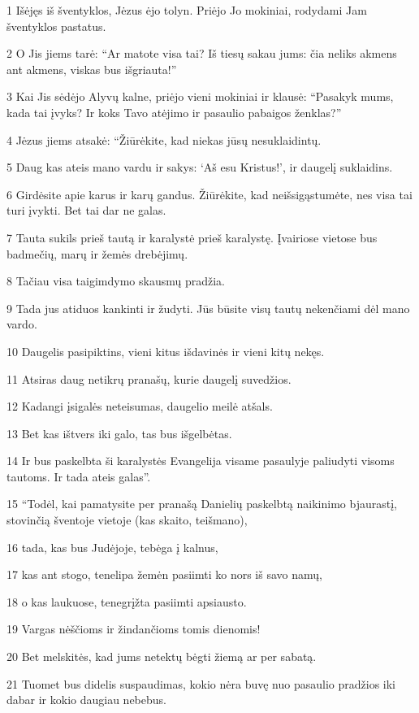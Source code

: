 \par 1 Išėjęs iš šventyklos, Jėzus ėjo tolyn. Priėjo Jo mokiniai, rodydami Jam šventyklos pastatus. 
\par 2 O Jis jiems tarė: “Ar matote visa tai? Iš tiesų sakau jums: čia neliks akmens ant akmens, viskas bus išgriauta!” 
\par 3 Kai Jis sėdėjo Alyvų kalne, priėjo vieni mokiniai ir klausė: “Pasakyk mums, kada tai įvyks? Ir koks Tavo atėjimo ir pasaulio pabaigos ženklas?” 
\par 4 Jėzus jiems atsakė: “Žiūrėkite, kad niekas jūsų nesuklaidintų. 
\par 5 Daug kas ateis mano vardu ir sakys: ‘Aš esu Kristus!’, ir daugelį suklaidins. 
\par 6 Girdėsite apie karus ir karų gandus. Žiūrėkite, kad neišsigąstumėte, nes visa tai turi įvykti. Bet tai dar ne galas. 
\par 7 Tauta sukils prieš tautą ir karalystė prieš karalystę. Įvairiose vietose bus badmečių, marų ir žemės drebėjimų. 
\par 8 Tačiau visa tai­gimdymo skausmų pradžia. 
\par 9 Tada jus atiduos kankinti ir žudyti. Jūs būsite visų tautų nekenčiami dėl mano vardo. 
\par 10 Daugelis pasipiktins, vieni kitus išdavinės ir vieni kitų nekęs. 
\par 11 Atsiras daug netikrų pranašų, kurie daugelį suvedžios. 
\par 12 Kadangi įsigalės neteisumas, daugelio meilė atšals. 
\par 13 Bet kas ištvers iki galo, tas bus išgelbėtas. 
\par 14 Ir bus paskelbta ši karalystės Evangelija visame pasaulyje paliudyti visoms tautoms. Ir tada ateis galas”. 
\par 15 “Todėl, kai pamatysite per pranašą Danielių paskelbtą naikinimo bjaurastį, stovinčią šventoje vietoje (kas skaito, teišmano), 
\par 16 tada, kas bus Judėjoje, tebėga į kalnus, 
\par 17 kas ant stogo, tenelipa žemėn pasiimti ko nors iš savo namų, 
\par 18 o kas laukuose, tenegrįžta pasiimti apsiausto. 
\par 19 Vargas nėščioms ir žindančioms tomis dienomis! 
\par 20 Bet melskitės, kad jums netektų bėgti žiemą ar per sabatą. 
\par 21 Tuomet bus didelis suspaudimas, kokio nėra buvę nuo pasaulio pradžios iki dabar ir kokio daugiau nebebus. 
